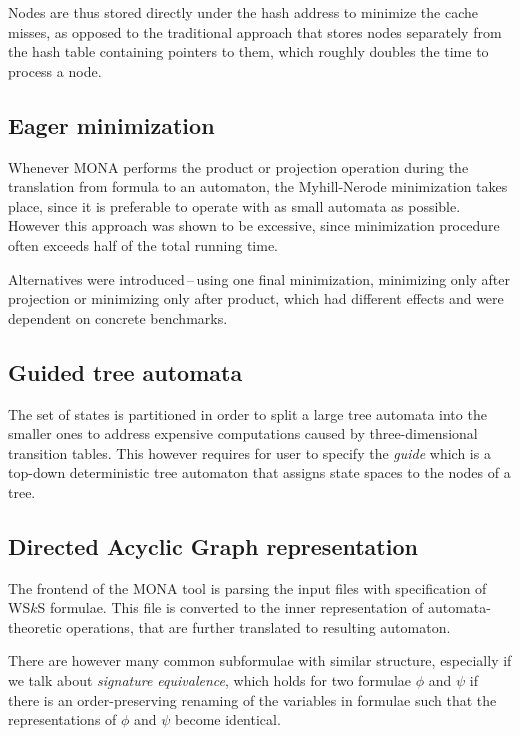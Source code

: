 Nodes are thus stored directly under the hash address to minimize the cache
misses, as opposed to the traditional approach that stores nodes separately from
the hash table containing pointers to them, which roughly doubles the time to
process a node.

\subsection{Eager minimization}
Whenever MONA performs the product or projection operation during the
translation from formula to an automaton, the Myhill-Nerode minimization takes
place, since it is preferable to operate with as small automata as possible.
However this approach was shown to be excessive, since minimization procedure
often exceeds half of the total running time.

Alternatives were introduced\,--\,using one final minimization, minimizing only
after projection or minimizing only after product, which had different effects
and were dependent on concrete benchmarks.

\subsection{Guided tree automata}

The set of states is partitioned in order to split a large tree automata into
the smaller ones to address expensive computations caused by three-dimensional
transition tables. This however requires for user to specify the \emph{guide}
which is a top-down deterministic tree automaton that assigns state spaces to
the nodes of a tree.

\subsection{Directed Acyclic Graph representation}\label{dag}

The frontend of the MONA tool is parsing the input files with specification of
WS$k$S formulae. This file is converted to the inner representation of
automata-theoretic operations, that are further translated to resulting
automaton.

There are however many common subformulae with similar structure, especially if
we talk about \emph{signature equivalence}, which holds for two formulae $\phi$
and $\psi$ if there is an order-preserving renaming of the variables in formulae
such that the representations of $\phi$ and $\psi$ become identical.

